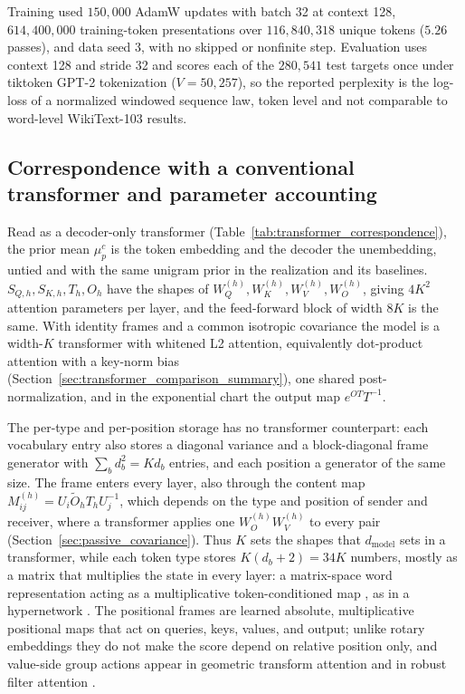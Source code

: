 \documentclass[twoside,11pt]{article}
\begin{document}
Training used $150{,}000$ AdamW updates with batch 32 at context 128, $614{,}400{,}000$ training-token presentations over $116{,}840{,}318$ unique tokens ($5.26$ passes), and data seed 3, with no skipped or nonfinite step. %
Evaluation uses context 128 and stride 32 and scores each of the $280{,}541$ test targets once under tiktoken GPT-2 tokenization ($V=50{,}257$), so the reported perplexity is the log-loss of a normalized windowed sequence law, token level and not comparable to word-level WikiText-103 results. %

\subsection{Correspondence with a conventional transformer and parameter accounting}
\label{sec:param_accounting}

Read as a decoder-only transformer (Table~\ref{tab:transformer_correspondence}), the prior mean $\mu_p^c$ is the token embedding and the decoder the unembedding, untied and with the same unigram prior in the realization and its baselines. $S_{Q,h},S_{K,h},T_h,O_h$ have the shapes of $W_Q^{(h)},W_K^{(h)},W_V^{(h)},W_O^{(h)}$, giving $4K^2$ attention parameters per layer, and the feed-forward block of width $8K$ is the same. With identity frames and a common isotropic covariance the model is a width-$K$ transformer with whitened L2 attention, equivalently dot-product attention with a key-norm bias (Section~\ref{sec:transformer_comparison_summary}), one shared post-normalization, and in the exponential chart the output map $e^{OT}T^{-1}$.

The per-type and per-position storage has no transformer counterpart: each vocabulary entry also stores a diagonal variance and a block-diagonal frame generator with $\sum_bd_b^2=Kd_b$ entries, and each position a generator of the same size. The frame enters every layer, also through the content map $M^{(h)}_{ij}=U_i\widetilde O_hT_hU_j^{-1}$, which depends on the type and position of sender and receiver, where a transformer applies one $W_O^{(h)}W_V^{(h)}$ to every pair (Section~\ref{sec:passive_covariance}). Thus $K$ sets the shapes that $d_{\mathrm{model}}$ sets in a transformer, while each token type stores $K(d_b+2)=34K$ numbers, mostly as a matrix that multiplies the state in every layer: a matrix-space word representation \citep{RudolphGiesbrecht2010CMSM,Socher2012MVRNN,Mai2019CMOW} acting as a multiplicative token-conditioned map \citep{Jayakumar2020Multiplicative}, as in a hypernetwork \citep{Ha2017HyperNetworks}. The positional frames are learned absolute, multiplicative positional maps that act on queries, keys, values, and output; unlike rotary embeddings \citep{su2024roformer} they do not make the score depend on relative position only, and value-side group actions appear in geometric transform attention \citep{Miyato2024GTA} and in robust filter attention \citep{Racioppo2025RobustFilter}.
\end{document}
